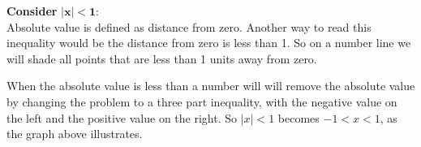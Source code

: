 \vspace{0.2cm}
\textbf{Consider} $\bm{|x|<1}$:\\
Absolute value is defined as distance from zero. Another way to read this inequality would be the distance from zero is less than 1. So on a number line we will shade all points that are less than 1 units away from zero.
    \begin{center}
    \end{center}
When the absolute value is less than a number will will remove the absolute value by changing the problem to a three part inequality, with the negative value on the left and the positive value on the right. So $|x| < 1$ becomes $− 1 < x < 1$, as the graph above illustrates.

